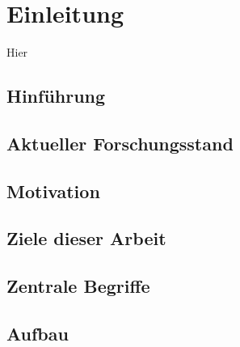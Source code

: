 \chapter{Einleitung}
\label{cha:Einleitung}

Hier\todo

\section{Hinf\"uhrung}
\label{sec:hinfuhrung}

\section{Aktueller Forschungsstand}
\label{sec:aktueller_forschungsstand}

\section{Motivation}
\label{sec:motivation}

\section{Ziele dieser Arbeit}
\label{sec:ziele_dieser_arbeit}

\section{Zentrale Begriffe}
\label{sec:zentrale_begriffe}

\section{Aufbau}
\label{sec:aufbau}